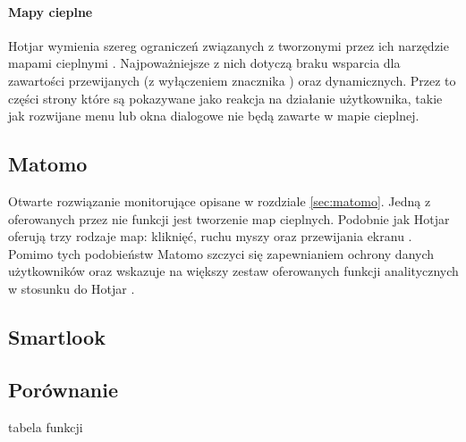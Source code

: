 \paragraph{Mapy cieplne}
Hotjar wymienia szereg ograniczeń związanych z tworzonymi przez ich narzędzie mapami cieplnymi \cite{Hotjar_limitations}. Najpoważniejsze z nich dotyczą braku wsparcia dla zawartości przewijanych (z wyłączeniem znacznika ) oraz  dynamicznych. Przez to części strony które są pokazywane jako reakcja na działanie użytkownika, takie jak rozwijane menu lub okna dialogowe nie będą zawarte w mapie cieplnej.

\subsection{Matomo}
Otwarte rozwiązanie monitorujące opisane w rozdziale \ref{sec:matomo}. Jedną z oferowanych przez nie funkcji jest tworzenie map cieplnych. Podobnie jak Hotjar oferują trzy rodzaje map: kliknięć, ruchu myszy oraz przewijania ekranu \cite{Matomo_heatmaps}. Pomimo tych podobieństw Matomo szczyci się zapewnianiem ochrony danych użytkowników oraz wskazuje na większy zestaw oferowanych funkcji analitycznych w stosunku do Hotjar \cite{Matomo_hotjar}.

\subsection{Smartlook}

\subsection{Porównanie}
tabela funkcji

